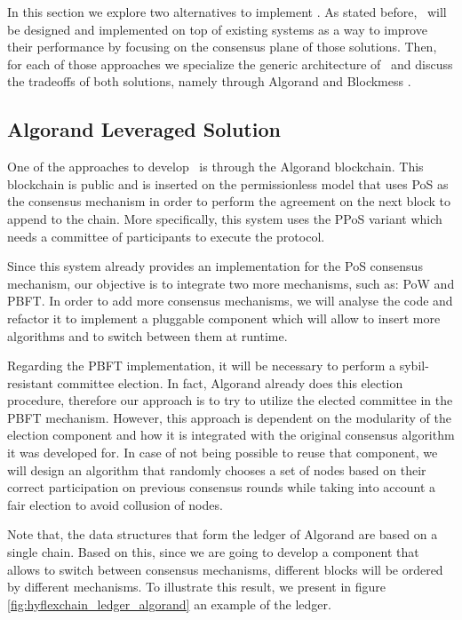 In this section we explore two alternatives to implement \mysystem. As stated before, \mysystem~will be designed and implemented on top of existing systems as a way to improve their performance by focusing on the consensus plane of those solutions. Then, for each of those approaches we specialize the generic architecture of \mysystem~and discuss the tradeoffs of both solutions, namely through Algorand \cite{algorand_scaling_bft_cryptocurrencies} and Blockmess \cite{blockmess}.

\subsection{Algorand Leveraged Solution}

One of the approaches to develop \mysystem~is through the Algorand blockchain. This blockchain is public and is inserted on the permissionless model that uses \gls{PoS} as the consensus mechanism in order to perform the agreement on the next block to append to the chain. More specifically, this system uses the \gls{PPoS} variant which needs a committee of participants to execute the protocol. %

Since this system already provides an implementation for the \gls{PoS} consensus mechanism, our objective is to integrate two more mechanisms, such as: \gls{PoW} and \gls{PBFT}. In order to add more consensus mechanisms, we will analyse the code and refactor it to implement a pluggable component which will allow to insert more algorithms and to switch between them at runtime.

Regarding the \gls{PBFT} implementation, it will be necessary to perform a sybil-resistant committee election. In fact, Algorand already does this election procedure, therefore our approach is to try to utilize the elected committee in the \gls{PBFT} mechanism. However, this approach is dependent on the modularity of the election component and how it is integrated with the original consensus algorithm it was developed for. In case of not being possible to reuse that component, we will design an algorithm that randomly chooses a set of nodes based on their correct participation on previous consensus rounds while taking into account a fair election to avoid collusion of nodes.

Note that, the data structures that form the ledger of Algorand are based on a single chain. Based on this, since we are going to develop a component that allows to switch between consensus mechanisms, different blocks will be ordered by different mechanisms. To illustrate this result, we present in figure \ref{fig:hyflexchain_ledger_algorand} an example of the ledger.

